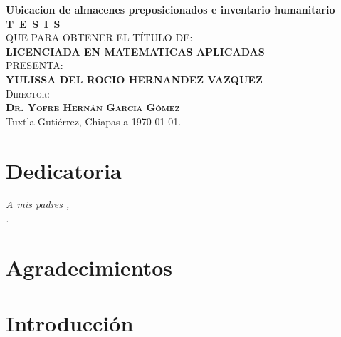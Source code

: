 \documentclass[
  spanish,
  us-letterpaper,
]{scrreprt}
\numberwithin{equation}{chapter} %
\renewcommand*\contentsname{Tabla de contenidos}
\newcommand\contentsname{Tabla de contenidos}
\begin{document}
\begin{titlepage}
\begin{minipage}[t][0.95\textheight][c]{0.76\textwidth}
            \begin{center}
                {\Large\bfseries Ubicacion de almacenes preposicionados e inventario humanitario}\\[2cm]
                \textsc{\huge \textbf{T\, E\, S\, I\, S}}\\[1.5cm]
                \textsc{\large QUE PARA OBTENER EL TÍTULO DE:}\\[0.3cm]
                \textbf{\textsc{LICENCIADA EN MATEMATICAS APLICADAS}}\\[1.5cm]
                \textsc{\large PRESENTA:}\\[0.3cm]
                \textbf{\textsc{\large {YULISSA DEL ROCIO HERNANDEZ VAZQUEZ}}}\\[2cm]
                {\large\scshape Director:\\[0.3cm]
                {\textbf{\large Dr. Yofre Hernán García Gómez }}}\\[2.0cm]
                \large{Tuxtla Gutiérrez, Chiapas a \today.}

            \end{center}
\end{minipage}
\end{titlepage}

\pagebreak[2]

\chapter*{Dedicatoria}
\begin{flushright}
\textit{A mis padres , \\.}
\end{flushright}


\chapter*{Agradecimientos}
\renewcommand*\contentsname{Tabla de contenidos}
{
\hypersetup{linkcolor=}
\setcounter{tocdepth}{2}
\tableofcontents
}


\chapter{}\label{section}


\chapter{Introducción}\label{introducciuxf3n}
\end{document}
